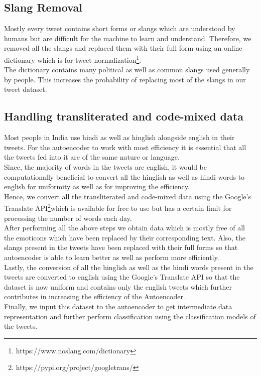 \documentclass[a4paper,11pt]{article}
\begin{document}
\subsection{Slang Removal}
Mostly every tweet contains short forms or slangs which are understood by humans but are difficult for the machine to learn and understand. Therefore, we removed all the slangs and replaced them with their full form using an online dictionary which is for tweet normalization\footnote{https://www.noslang.com/dictionary}.
\medskip\\
The dictionary contains many political as well as common slangs used generally by people. This increases the probability of replacing most of the slangs in our tweet dataset.
\subsection{Handling transliterated and code-mixed data}
Most people in India use hindi as well as hinglish alongside english in their tweets. For the autoencoder to work with most efficiency it is essential that all the tweets fed into it are of the same nature or language.\medskip\\
Since, the majority of words in the tweets are english, it would be computationally beneficial to convert all the hinglish as well as hindi words to english for uniformity as well as for improving the efficiency.
\medskip\\
Hence, we convert all the transliterated and code-mixed data\cite{das2014identifying} using the Google's Translate API\footnote{https://pypi.org/project/googletrans/}which is available for free to use but has a certain limit for processing the number of words each day.
\medskip\\
After performing all the above steps we obtain data which is mostly free of all the emoticons which have been replaced by their corresponding text. Also, the slangs present in the tweets have been replaced with their full forms so that autoencoder is able to learn better as well as perform more efficiently.\\
Lastly, the conversion of all the hinglish as well as the hindi words present in the tweets are converted to english using the Google's Translate API so that the dataset is now uniform and contains only the english tweets which further contributes in increasing the efficiency of the Autoencoder.
\medskip\\
Finally, we input this dataset to the autoencoder to get intermediate data representation and further perform classification using the classification models of the tweets.
\newpage
\end{document}
